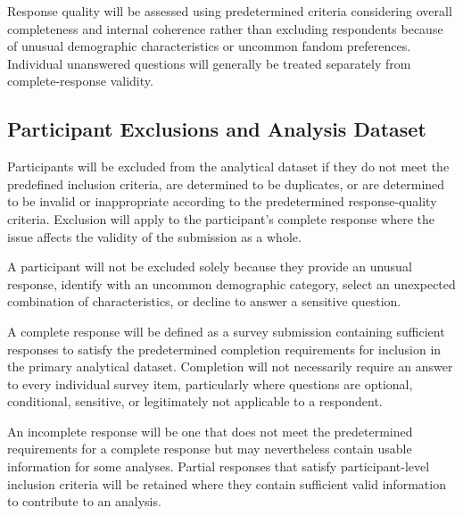 Response quality will be assessed using predetermined criteria considering overall completeness and internal coherence rather than excluding respondents because of unusual demographic characteristics or uncommon fandom preferences. Individual unanswered questions will generally be treated separately from complete-response validity.


\subsection{Participant Exclusions and Analysis Dataset}

Participants will be excluded from the analytical dataset if they do not meet the predefined inclusion criteria, are determined to be duplicates, or are determined to be invalid or inappropriate according to the predetermined response-quality criteria. Exclusion will apply to the participant's complete response where the issue affects the validity of the submission as a whole.

A participant will not be excluded solely because they provide an unusual response, identify with an uncommon demographic category, select an unexpected combination of characteristics, or decline to answer a sensitive question.

A complete response will be defined as a survey submission containing sufficient responses to satisfy the predetermined completion requirements for inclusion in the primary analytical dataset. Completion will not necessarily require an answer to every individual survey item, particularly where questions are optional, conditional, sensitive, or legitimately not applicable to a respondent.

An incomplete response will be one that does not meet the predetermined requirements for a complete response but may nevertheless contain usable information for some analyses. Partial responses that satisfy participant-level inclusion criteria will be retained where they contain sufficient valid information to contribute to an analysis.


